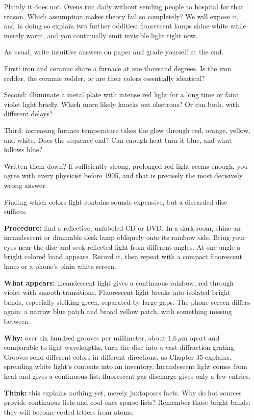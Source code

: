 Plainly it does not. Ovens run daily without sending people to hospital for that reason. Which assumption makes theory fail so completely? We will expose it, and in doing so explain two further oddities: fluorescent lamps shine white while merely warm, and you continually emit invisible light right now.


As usual, write intuitive answers on paper and grade yourself at the end.

First: iron and ceramic share a furnace at one thousand degrees. Is the iron redder, the ceramic redder, or are their colors essentially identical?

Second: illuminate a metal plate with intense red light for a long time or faint violet light briefly. Which more likely knocks out electrons? Or can both, with different delays?

Third: increasing furnace temperature takes the glow through red, orange, yellow, and white. Does the sequence end? Can enough heat turn it blue, and what follows blue?

Written them down? If sufficiently strong, prolonged red light seems enough, you agree with every physicist before 1905, and that is precisely the most decisively wrong answer.


\begin{experiment}
Finding which colors light contains sounds expensive, but a discarded disc suffices.

\textbf{Procedure:} find a reflective, unlabeled CD or DVD. In a dark room, shine an incandescent or dimmable desk lamp obliquely onto its rainbow side. Bring your eyes near the disc and seek reflected light from different angles. At one angle a bright colored band appears. Record it, then repeat with a compact fluorescent lamp or a phone's plain white screen.

\textbf{What appears:} incandescent light gives a continuous rainbow, red through violet with smooth transitions. Fluorescent light breaks into isolated bright bands, especially striking green, separated by large gaps. The phone screen differs again: a narrow blue patch and broad yellow patch, with something missing between.

\textbf{Why:} over six hundred grooves per millimeter, about \(1.6\,\mu\mathrm{m}\) apart and comparable to light wavelengths, turn the disc into a vast diffraction grating. Grooves send different colors in different directions, as Chapter 35 explains, spreading white light's contents into an inventory. Incandescent light comes from heat and gives a continuous list; fluorescent gas discharge gives only a few entries.

\textbf{Think:} this explains nothing yet, merely juxtaposes facts. Why do hot sources provide continuous lists and cool ones sparse lists? Remember those bright bands: they will become coded letters from atoms.
\end{experiment}

